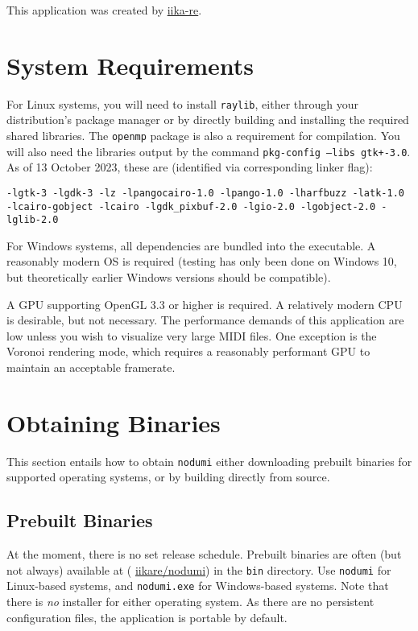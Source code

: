 \documentclass[english]{article}
\makeatletter
\newenvironment{restoretext}%
    {\@parboxrestore%
     \begin{adjustwidth}{}{\leftmargin}%
    }{\end{adjustwidth}
     }
\def\rcbegin{\begin{restoretext}\centering}
\def\rcend{\end{restoretext}}
\providecommand{\mi}[1]{\texttt{#1}}
\makeatother
\begin{document}
This application was created by \textcolor{lcol}{\href{https://iika.re}{iika-re}}.

\section{System Requirements}

For Linux systems, you will need to install \mi{raylib}, either through your distribution's package manager or by directly
building and installing the required shared libraries. The \mi{openmp} package is also a requirement for compilation.
You will also need the libraries output by the command
\mi{pkg-config --libs gtk+-3.0}. As of 13 October 2023, these are (identified via corresponding linker flag): 

\vspace{1em}

\rcbegin
  \mi{-lgtk-3 -lgdk-3 -lz -lpangocairo-1.0 -lpango-1.0 -lharfbuzz -latk-1.0
      -lcairo-gobject -lcairo -lgdk_pixbuf-2.0 -lgio-2.0 -lgobject-2.0 -lglib-2.0}
\rcend

\vspace{1em}

For Windows systems, all dependencies are bundled into the executable. A reasonably modern OS is required (testing has
only been done on Windows 10, but theoretically earlier Windows versions should be compatible).

A GPU supporting OpenGL 3.3 or higher is required. A relatively modern CPU is desirable, but not necessary.
The performance demands of this application are low unless you wish to visualize very large MIDI files.
One exception is the Voronoi rendering mode, which requires a reasonably performant GPU to maintain an acceptable framerate.

\section{Obtaining Binaries}
\label{sec:obtain}

This section entails how to obtain \mi{nodumi} \textendash{} either downloading prebuilt binaries for supported operating systems,
or by building directly from source.

\subsection{Prebuilt Binaries}

At the moment, there is no set release schedule. Prebuilt binaries are often (but not always) available at 
\textcolor{lcol}{(\raisebox{-0.1\height}{\faGithub} \href{https://github.com/iikare/nodumi}{iikare/nodumi})}
in the \mi{bin} directory. Use \mi{nodumi} for Linux-based systems, and \mi{nodumi.exe} for Windows-based systems.
Note that there is \textit{no} installer for either operating system. As there are no persistent configuration files,
the application is portable by default.
\end{document}
